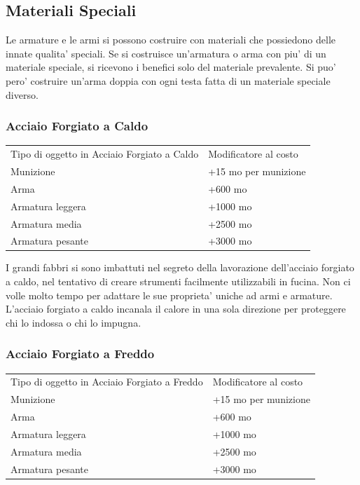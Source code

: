 \documentclass[a4paper,11pt,twoside,openany]{dndbook}
\begin{document}
{\pagebreak

\subsection{Materiali Speciali}

Le armature e le armi si possono costruire con materiali che possiedono delle innate qualita' speciali. Se si costruisce un'armatura o arma con piu' di un materiale speciale, si ricevono i benefici solo del materiale prevalente. Si puo' pero' costruire un'arma doppia con ogni testa fatta di un materiale speciale diverso.

\subsubsection{Acciaio Forgiato a Caldo}

\label{acciaio-forgiato-a-caldo}

\begin{tabular}[c]{@{}ll@{}}
\toprule 
Tipo di oggetto in Acciaio Forgiato a Caldo & Modificatore al costo\tabularnewline
Munizione & +15 mo per munizione\tabularnewline
Arma & +600 mo\tabularnewline
Armatura leggera & +1000 mo\tabularnewline
Armatura media & +2500 mo\tabularnewline
Armatura pesante & +3000 mo\tabularnewline
\bottomrule
\end{tabular}

I grandi fabbri si sono imbattuti nel segreto della lavorazione dell'acciaio
forgiato a caldo, nel tentativo di creare strumenti facilmente utilizzabili
in fucina. Non ci volle molto tempo per adattare le sue proprieta'
uniche ad armi e armature. L'acciaio forgiato a caldo incanala il
calore in una sola direzione per proteggere chi lo indossa o chi lo
impugna.

\subsubsection{Acciaio Forgiato a Freddo}

\label{acciaio-forgiato-a-freddo}

\begin{tabular}[c]{@{}ll@{}}
\toprule 
Tipo di oggetto in Acciaio Forgiato a Freddo & Modificatore al costo\tabularnewline
Munizione & +15 mo per munizione\tabularnewline
Arma & +600 mo\tabularnewline
Armatura leggera & +1000 mo\tabularnewline
Armatura media & +2500 mo\tabularnewline
Armatura pesante & +3000 mo\tabularnewline
\bottomrule
\end{tabular}

}
\end{document}
